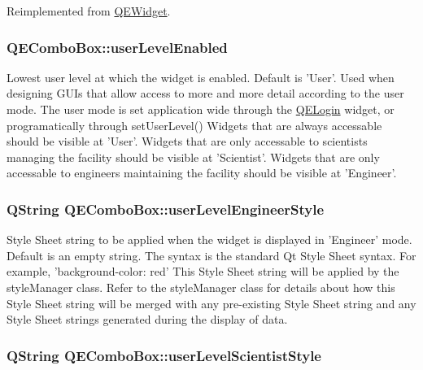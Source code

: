 Reimplemented from \hyperlink{classQEWidget}{QEWidget}.

\hypertarget{classQEComboBox_af06e9e0b1aaa71c0ceca408ecb9d1a88}{
\subsubsection[{userLevelEnabled}]{ QEComboBox::userLevelEnabled}}
\label{classQEComboBox_af06e9e0b1aaa71c0ceca408ecb9d1a88}
Lowest user level at which the widget is enabled. Default is 'User'. Used when designing GUIs that allow access to more and more detail according to the user mode. The user mode is set application wide through the \hyperlink{classQELogin}{QELogin} widget, or programatically through setUserLevel() Widgets that are always accessable should be visible at 'User'. Widgets that are only accessable to scientists managing the facility should be visible at 'Scientist'. Widgets that are only accessable to engineers maintaining the facility should be visible at 'Engineer'. \hypertarget{classQEComboBox_a81ad676e362ee95ebe5e5ec1caa7deb3}{
\subsubsection[{userLevelEngineerStyle}]{\setlength{\rightskip}{0pt plus 5cm}QString QEComboBox::userLevelEngineerStyle}}
\label{classQEComboBox_a81ad676e362ee95ebe5e5ec1caa7deb3}
Style Sheet string to be applied when the widget is displayed in 'Engineer' mode. Default is an empty string. The syntax is the standard Qt Style Sheet syntax. For example, 'background-\/color: red' This Style Sheet string will be applied by the styleManager class. Refer to the styleManager class for details about how this Style Sheet string will be merged with any pre-\/existing Style Sheet string and any Style Sheet strings generated during the display of data. \hypertarget{classQEComboBox_a75af85e06871bc7127e592bc08e26804}{
\subsubsection[{userLevelScientistStyle}]{\setlength{\rightskip}{0pt plus 5cm}QString QEComboBox::userLevelScientistStyle}}
